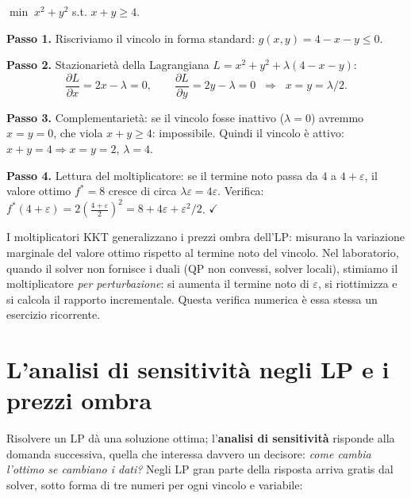 \begin{esempio}
$\min\; x^2 + y^2$ s.t. $x + y \ge 4$.

\textbf{Passo 1.} Riscriviamo il vincolo in forma standard: $g(x,y) = 4 - x - y \le 0$.

\textbf{Passo 2.} Stazionarietà della Lagrangiana $L = x^2 + y^2 + \lambda(4 - x - y)$:
\[
\frac{\partial L}{\partial x} = 2x - \lambda = 0, \qquad
\frac{\partial L}{\partial y} = 2y - \lambda = 0
\;\;\Rightarrow\;\; x = y = \lambda/2 .
\]

\textbf{Passo 3.} Complementarietà: se il vincolo fosse inattivo ($\lambda = 0$)
avremmo $x = y = 0$, che viola $x + y \ge 4$: impossibile. Quindi il vincolo è attivo:
$x + y = 4 \Rightarrow x = y = 2$, $\lambda = 4$.

\textbf{Passo 4.} Lettura del moltiplicatore: se il termine noto passa da $4$ a
$4 + \varepsilon$, il valore ottimo $f^* = 8$ cresce di circa
$\lambda\varepsilon = 4\varepsilon$. Verifica: $f^*(4+\varepsilon) =
2\left(\frac{4+\varepsilon}{2}\right)^2 = 8 + 4\varepsilon + \varepsilon^2/2$.
\hfill$\checkmark$
\end{esempio}

\begin{spiegazione}
I moltiplicatori KKT generalizzano i prezzi ombra dell'LP: misurano la variazione
marginale del valore ottimo rispetto al termine noto del vincolo. Nel laboratorio,
quando il solver non fornisce i duali (QP non convessi, solver locali), stimiamo il
moltiplicatore \emph{per perturbazione}: si aumenta il termine noto di
$\varepsilon$, si riottimizza e si calcola il rapporto incrementale. Questa verifica
numerica è essa stessa un esercizio ricorrente.
\end{spiegazione}

\section{L'analisi di sensitività negli LP e i prezzi ombra}
\label{sec:sensitivita-lp}

Risolvere un LP dà una soluzione ottima; l'\textbf{analisi di sensitività} risponde
alla domanda successiva, quella che interessa davvero un decisore: \emph{come cambia
l'ottimo se cambiano i dati?} Negli LP gran parte della risposta arriva gratis dal
solver, sotto forma di tre numeri per ogni vincolo e variabile:

